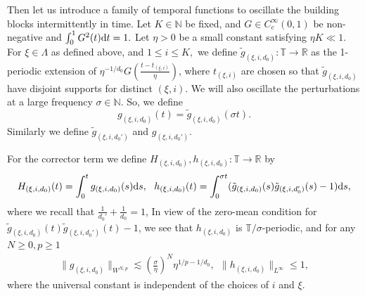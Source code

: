 \documentclass[UTF-8,reqno]{amsart}
\numberwithin{equation}{section}
\theoremstyle{definition}
\def\dif{{\mathord{{\rm d}}}}
\def\mN{{\mathbb N}}
\def\geq{\geqslant}
\def\leq{\leqslant}
\def\le{\leqslant}
\def\dif{{\mathord{{\rm d}}}}
\def\geq{\geqslant}
\def\leq{\leqslant}
\def\le{\leqslant}
\begin{document}
Then let us  introduce a family of temporal functions   to oscillate the building blocks intermittently in time.
Let  $K\in\mN$ be fixed, and $G \in C_c^\infty(0, 1)$ be non-negative and 
$ \int_0^1G^2(t)\dif t=1.$
  Let $\eta >0$  be a small constant satisfying $ \eta K\ll1$. For $\xi\in\Lambda$ as defined above,  and $1\le i\le K,$ we define $\tilde{g}_{(\xi,i,d_0)}: \mathbb{T}\to \mathbb{R}$ as the 1-periodic extension of $\eta^{-1/d_0}G(\frac {t-t_{(\xi,i)}}{\eta})$,  where $t_{(\xi,i)}$ are chosen so that $\tilde{g}_{(\xi,i,d_0)}$ have disjoint supports for distinct $(\xi,i)$.  
We will also oscillate the perturbations at a large
frequency $\sigma\in\mathbb{N}$. So, we define
$$g_{(\xi,i,d_0)}(t)=\tilde{g}_{(\xi,i,d_0)}(\sigma t).$$
Similarly we define $\tilde{g}_{(\xi,i,d_0')} $ and $g_{(\xi,i,d_0')} $.

For the corrector term we define $H_{(\xi,i,d_0)},h_{(\xi,i,d_0)}:\mathbb{T}\to\mathbb{R}$ by
\begin{align}
H_{(\xi,i,d_0)}(t)=\int_0^{t}g_{(\xi,i,d_0)}(s)\dif s,\ \ h_{(\xi,i,d_0)}(t)=\int_0^{\sigma t}(\tilde{g}_{(\xi,i,d_0)}(s)\tilde{g}_{(\xi,i,d_0')}(s)-1)\dif s, \label{eq:parth}
\end{align}
where we recall that $\frac1{d_0'}+\frac1{d_0}=1$, In view of the zero-mean condition for $\tilde{g}_{(\xi,i,d_0)}(t)\tilde{g}_{(\xi,i,d_0')}(t)-1$, we see that $h_{(\xi,i,d_0)}$ is $\mathbb{T}/\sigma$-periodic, and for any $N\geq0,p\geq1$
\begin{align}
    \|g_{(\xi,i,d_0)}\|_{W^{N,p}}\lesssim(\frac{\sigma}{\eta})^N\eta^{1/p-1/d_0},\  \  \|h_{(\xi,i,d_0)}\|_{L^\infty}\leq1,\label{bd:gwnp}
\end{align}
where the universal constant is independent of the choices of  $i$ and $\xi$.
\end{document}
